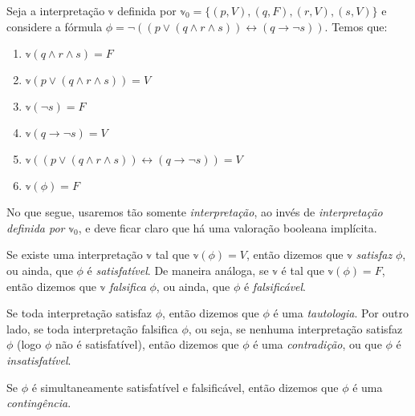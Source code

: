 \begin{example}
    Seja a interpretação $\mathbb{v}$ definida por $\mathbb{v}_0 = \{(p,V),(q,F),(r,V),(s,V)\}$ e considere a fórmula $\phi = \neg((p \vee (q \wedge r \wedge s)) \leftrightarrow (q \rightarrow \neg s))$. Temos que:
    \begin{enumerate}
        \item $\mathbb{v}(q \wedge r \wedge s) = F$
        \item $\mathbb{v}(p \vee (q \wedge r \wedge s)) = V$
        \item $\mathbb{v}(\neg s) = F$
        \item $\mathbb{v}(q \rightarrow \neg s) = V$
        \item $\mathbb{v}((p \vee (q \wedge r \wedge s)) \leftrightarrow (q \rightarrow \neg s)) = V$
        \item $\mathbb{v}(\phi) = F$
    \end{enumerate}
\end{example}

No que segue, usaremos tão somente \emph{interpretação}, ao invés de \emph{interpretação definida por $\mathbb{v}_0$}, e deve ficar claro que há uma valoração booleana implícita.

\begin{definition}
	Se existe uma interpretação $\mathbb{v}$ tal que $\mathbb{v}(\phi) = V$, então dizemos que $\mathbb{v}$ \emph{satisfaz} $\phi$, ou ainda, que $\phi$ é \emph{satisfatível}. De maneira análoga, se $\mathbb{v}$ é tal que $\mathbb{v}(\phi) = F$, então dizemos que $\mathbb{v}$ \emph{falsifica} $\phi$, ou ainda, que $\phi$ é \emph{falsificável}.
	
	Se toda interpretação satisfaz $\phi$, então dizemos que $\phi$ é uma \emph{tautologia}. Por outro lado, se toda interpretação falsifica $\phi$, ou seja, se nenhuma interpretação satisfaz $\phi$ (logo $\phi$ não é satisfatível), então dizemos que $\phi$ é uma \emph{contradição}, ou que $\phi$ é \emph{insatisfatível}.
	
	Se $\phi$ é simultaneamente satisfatível e falsificável, então dizemos que $\phi$ é uma \emph{contingência}.
\end{definition}

